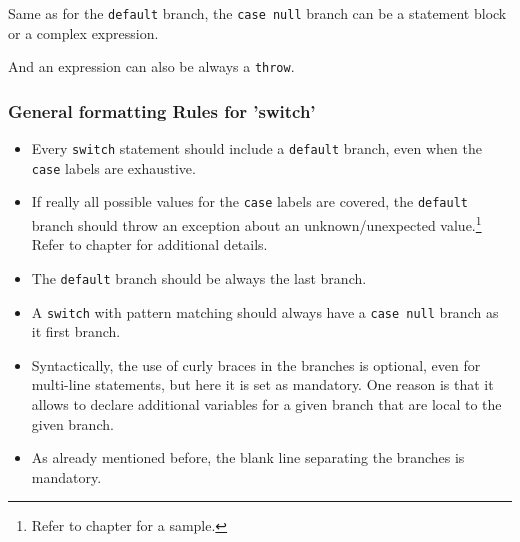 Same as for the \lstinline|default| branch, the \lstinline|case null| branch can be a statement block or a complex expression.

And an expression can also be always a \lstinline|throw|.


\subsubsection{General formatting Rules for ’switch’}
\begin{itemize}
\item{Every \lstinline|switch| statement should include a \lstinline|default| branch, even when the \lstinline|case| labels are exhaustive.}

\item{If really all possible values for the \lstinline|case| labels are covered, the \lstinline|default| branch should throw an exception about an unknown/unexpected value.\footnote{Refer to chapter \autocite{TQUADRAT_ORG_FOUNDATION_UNSUPPORTEDENUMERROR} for a sample.}  Refer to chapter  for additional details.}

\item{The \lstinline|default| branch should be always the last branch.}

\item{A \lstinline|switch| with pattern matching should always have a \lstinline|case null| branch as it first branch.}

\item{Syntactically, the use of curly braces in the branches is optional, even for multi-line statements, but here it is set as mandatory. One reason is that it allows to declare additional variables for a given branch that are local to the given branch.}

\item{As already mentioned before, the blank line separating the branches is mandatory.}
\end{itemize}





